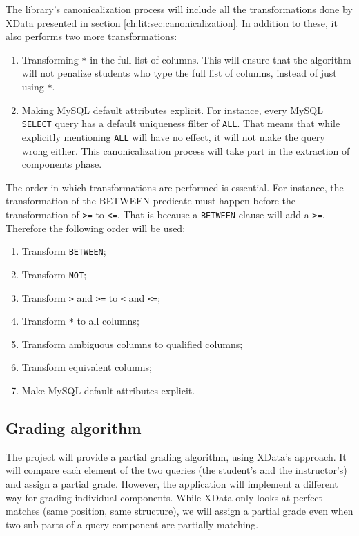 The library's canonicalization process will include all the transformations done by XData presented in section \ref{ch:lit:sec:canonicalization}. In addition to these, it also performs two more transformations:
\begin{enumerate}
    \item Transforming \texttt{*} in the full list of columns. This will ensure that the algorithm will not penalize students who type the full list of columns, instead of just using  \texttt{*}.
    \item Making MySQL default attributes explicit. For instance, every MySQL \texttt{SELECT} query has a default uniqueness filter of \texttt{ALL}. That means that while explicitly mentioning \texttt{ALL} will have no effect, it will not make the query wrong either. This canonicalization process will take part in the extraction of components phase.
\end{enumerate}

The order in which transformations are performed is essential. For instance, the transformation of the BETWEEN predicate must happen before the transformation of \texttt{>=} to \texttt{<=}. That is because a \texttt{BETWEEN} clause will add a \texttt{>=}. Therefore the following order will be used:
\begin{enumerate}
    \item Transform \texttt{BETWEEN};
    \item Transform \texttt{NOT};
    \item Transform \texttt{>} and \texttt{>=} to \texttt{<} and \texttt{<=};
    \item Transform \texttt{*} to all columns;
    \item Transform ambiguous columns to qualified columns;
    \item Transform equivalent columns;
    \item Make MySQL default attributes explicit.
\end{enumerate}

\subsection{Grading algorithm} \label{ch:des:grading}

The project will provide a partial grading algorithm, using XData's approach. It will compare each element of the two queries (the student's and the instructor's) and assign a partial grade. However, the application will implement a different way for grading individual components. While XData only looks at perfect matches (same position, same structure), we will assign a partial grade even when two sub-parts of a query component are partially matching.

